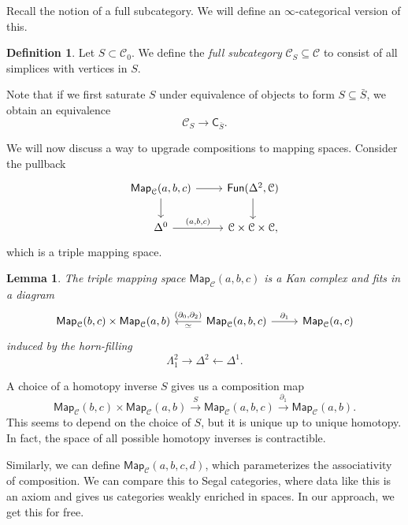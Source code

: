 \documentclass[10pt]{amsart}
\newtheorem{lem}[thm]{Lemma}
\theoremstyle{definition}
\newtheorem{defn}[thm]{Definition}
\theoremstyle{remark}
\theoremstyle{plain}
\theoremstyle{definition}
\theoremstyle{remark}
\newcommand{\mc}[1]{\mathcal{#1}}
\newcommand{\ms}[1]{\mathsf{#1}}
\newcommand{\1}{\mathbf{1}}
\newcommand{\2}{\mathbf{2}}
\newcommand{\3}{\mathbf{3}}
\begin{document}
Recall the notion of a full subcategory. We will define an $\infty$-categorical version of this.

\begin{defn}
    Let $S \subset \mc{C}_0$. We define the \textit{full subcategory} $\mc{C}_S \subseteq \mc{C}$ to consist of all simplices with vertices in $S$.
\end{defn}

Note that if we first saturate $S$ under equivalence of objects to form $S \subseteq \bar{S}$, we obtain an equivalence
\[ \mc{C}_S \to \ms{C}_{\bar{S}}. \]

We will now discuss a way to upgrade compositions to mapping spaces. Consider the pullback
\begin{equation*}
\begin{tikzcd}
    \ms{Map}_{\mc{C}}(a,b,c) \ar{r} \ar{d} & \ms{Fun}(\Delta^2, \mc{C}) \ar{d} \\
    \Delta^0 \ar{r}{(a,b,c)} & \mc{C} \times \mc{C} \times \mc{C},
\end{tikzcd}
\end{equation*}
which is a triple mapping space.

\begin{lem}
    The triple mapping space $\ms{Map}_{\mc{C}}(a,b,c)$ is a Kan complex and fits in a diagram
    \begin{equation*}
    \begin{tikzcd}
        \ms{Map}_{\mc{C}}(b,c) \times \ms{Map}_{\mc{C}}(a,b) & \ms{Map}_{\mc{C}}(a,b,c) \ar{l}[swap]{(\partial_0, \partial_2)}{\simeq} \ar{r}{\partial_1} & \ms{Map}_{\mc{C}}(a,c)
    \end{tikzcd}
    \end{equation*}
    induced by the horn-filling
    \[ \Lambda_1^2 \to \Delta^2 \gets \Delta^1. \]
\end{lem}

A choice of a homotopy inverse $S$ gives us a composition map
\[ \ms{Map}_{\mc{C}}(b,c) \times \ms{Map}_{\mc{C}}(a,b) \xrightarrow{S} \ms{Map}_{\mc{C}}(a,b,c) \xrightarrow{\partial_1} \ms{Map}_{\mc{C}}(a,b). \]
This seems to depend on the choice of $S$, but it is unique up to unique homotopy. In fact, the space of all possible homotopy inverses is contractible.

Similarly, we can define $\ms{Map}_{\mc{C}}(a,b,c,d)$, which parameterizes the associativity of composition. We can compare this to Segal categories, where data like this is an axiom and gives us categories weakly enriched in spaces. In our approach, we get this for free.
\end{document}
